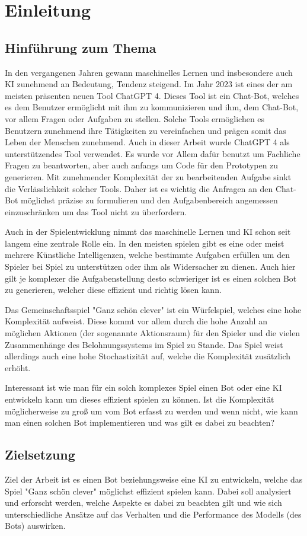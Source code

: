 \section{Einleitung}
\subsection{Hinführung zum Thema}
In den vergangenen Jahren gewann maschinelles Lernen und insbesondere auch KI zunehmend an Bedeutung, Tendenz steigend. Im Jahr 2023 ist eines der am meisten präsenten neuen Tool ChatGPT 4. Dieses Tool ist ein Chat-Bot, welches es dem Benutzer ermöglicht mit ihm zu kommunizieren und ihm, dem Chat-Bot, vor allem Fragen oder Aufgaben zu stellen. Solche Tools ermöglichen es Benutzern zunehmend ihre Tätigkeiten zu vereinfachen und prägen somit das Leben der Menschen zunehmend. Auch in dieser Arbeit wurde ChatGPT 4 als unterstützendes Tool verwendet. Es wurde vor Allem dafür benutzt um Fachliche Fragen zu beantworten, aber auch anfangs um Code für den Prototypen zu generieren. Mit zunehmender Komplexität der zu bearbeitenden Aufgabe sinkt die Verlässlichkeit solcher Tools. Daher ist es wichtig die Anfragen an den Chat-Bot möglichst präzise zu formulieren und den Aufgabenbereich angemessen einzuschränken um das Tool nicht zu überfordern.

Auch in der Spielentwicklung nimmt das maschinelle Lernen und KI schon seit langem eine zentrale Rolle ein. In den meisten spielen gibt es eine oder meist mehrere Künstliche Intelligenzen, welche bestimmte Aufgaben erfüllen um den Spieler bei Spiel zu unterstützen oder ihm als Widersacher zu dienen. Auch hier gilt je komplexer die Aufgabenstellung desto schwieriger ist es einen solchen Bot zu generieren, welcher diese effizient und richtig lösen kann.

Das Gemeinschaftsspiel "Ganz schön clever" ist ein Würfelspiel, welches eine hohe Komplexität aufweist. Diese kommt vor allem durch die hohe Anzahl an möglichen Aktionen (der sogenannte Aktionsraum) für den Spieler und die vielen Zusammenhänge des Belohnungssystems im Spiel zu Stande. Das Spiel weist allerdings auch eine hohe Stochastizität auf, welche die Komplexität zusätzlich erhöht.

Interessant ist wie man für ein solch komplexes Spiel einen Bot oder eine KI entwickeln kann um dieses effizient spielen zu können. Ist die Komplexität möglicherweise zu groß um vom Bot erfasst zu werden und wenn nicht, wie kann man einen solchen Bot implementieren und was gilt es dabei zu beachten?
\subsection{Zielsetzung}
Ziel der Arbeit ist es einen Bot beziehungsweise eine KI zu entwickeln, welche das Spiel "Ganz schön clever" möglichst effizient spielen kann. Dabei soll analysiert und erforscht werden, welche Aspekte es dabei zu beachten gilt und wie sich unterschiedliche Ansätze auf das Verhalten und die Performance des Modells (des Bots) auswirken.

